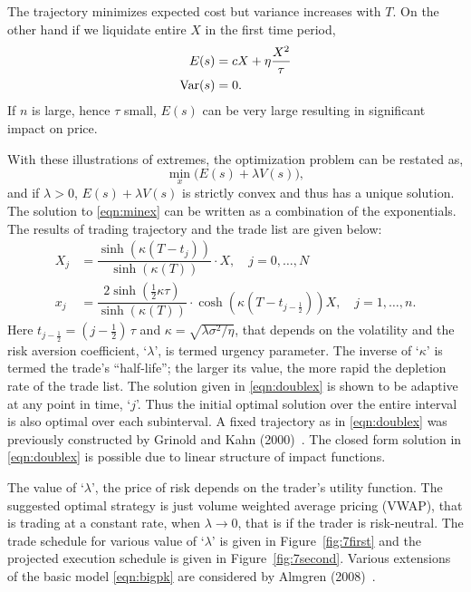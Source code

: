 The trajectory minimizes expected cost but variance increases with $T$. On the other hand if we liquidate entire $X$ in the first time period,
	\begin{equation}\label{eqn:anotherdoubleex}
	\begin{aligned}
	E(s)&= c X + \eta \frac{X^2}{\tau} \\
	\var(s)&= 0.
	\end{aligned}
	\end{equation}
If $n$ is large, hence $\tau$ small, $E(s)$ can be very large resulting in significant impact on price.


 With these illustrations of extremes, the optimization problem can be restated as,
	\begin{equation}\label{eqn:minex}
	\min_x\big( E(s) + \lambda V(s) \big),
	\end{equation}
and if $\lambda>0$, $E(s)+\lambda V(s)$ is strictly convex and thus has a unique solution. The solution to \eqref{eqn:minex} can be written as a combination of the exponentials. The results of trading trajectory and the trade list are given below:
	\begin{equation}\label{eqn:doublex}
	\begin{aligned}
	X_j &= \dfrac{\sinh (\kappa(T-t_j))}{\sinh (\kappa(T))}\cdot X, \quad j=0,\ldots,N \\
	x_j &= \dfrac{2 \sinh (\frac{1}{2}\kappa\tau)}{\sinh (\kappa(T))}\cdot \cosh(\kappa(T-t_{j-\frac{1}{2}}))X, \quad j=1,\ldots, n.
	\end{aligned}
	\end{equation}
Here $t_{j - \frac{1}{2}} = (j - \frac{1}{2})\, \tau$ and $\kappa = \sqrt{\lambda \sigma^2 / \eta}$, that depends on the volatility and the risk aversion coefficient, `$\lambda$', is termed urgency parameter. The inverse of `$\kappa$' is termed the trade's ``half-life''; the larger its value, the more rapid the depletion rate of the trade list. The solution given in \eqref{eqn:doublex} is shown to be adaptive at any point in time, `$j$'. Thus the initial optimal solution over the entire interval is also optimal over each subinterval. A fixed trajectory as in \eqref{eqn:doublex} was previously constructed by Grinold and Kahn (2000)~\cite{grin2000}. The closed form solution in \eqref{eqn:doublex} is possible due to linear structure of impact functions. 


The value of `$\lambda$', the price of risk depends on the trader's utility function. The suggested optimal strategy is just volume weighted average pricing (VWAP), that is trading at a constant rate, when $\lambda \to 0$, that is if the trader is risk-neutral. The trade schedule for various value of `$\lambda$' is given in Figure~\ref{fig:7first} and the projected execution schedule is given in Figure~\ref{fig:7second}. Various extensions of the basic model \eqref{eqn:bigpk} are considered by Almgren (2008)~\cite{alm2008}.
	
